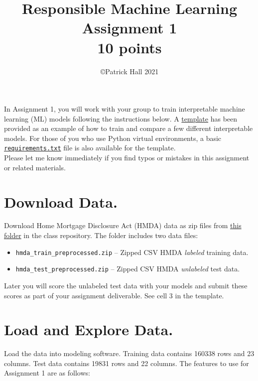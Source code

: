 \documentclass[fleqn]{article}
\title{Responsible Machine Learning\\\Large{Assignment 1}\\\Large{10 points}}
\author{\copyright Patrick Hall 2021}
\begin{document}
\maketitle

\noindent In Assignment 1, you will work with your group to train interpretable machine learning (ML) models following the instructions below. A \href{https://nbviewer.jupyter.org/github/jphall663/GWU_rml/blob/master/assignments/assignment_1/assign_1_template.ipynb}{template} has been provided as an example of how to train and compare a few different interpretable models. For those of you who use Python virtual environments, a basic \href{https://github.com/jphall663/GWU_rml/blob/master/assignments/requirements.txt}{\texttt{requirements.txt}} file is also available for the template.\\

\noindent Please let me know immediately if you find typos or mistakes in this assignment or related materials. 

\section{Download Data.}

Download Home Mortgage Disclosure Act (HMDA) data as zip files from \href{https://github.com/jphall663/GWU_rml/tree/master/assignments/data}{this folder} in the class repository. The folder includes two data files:

\begin{itemize}
	\item \texttt{hmda\_train\_preprocessed.zip} -- Zipped CSV HMDA \textit{labeled} training data.
	\item \texttt{hmda\_test\_preprocessed.zip} -- Zipped CSV HMDA \textit{unlabeled} test data.
\end{itemize}

\noindent Later you will score the unlabeled test data with your models and submit these scores as part of your assignment deliverable. See cell 3 in the template.

\section{Load and Explore Data.}

Load the data into modeling software. Training data contains 160338 rows and 23 columns. Test data contains 19831 rows and 22 columns. The features to use for Assignment 1 are as follows:
\end{document}
